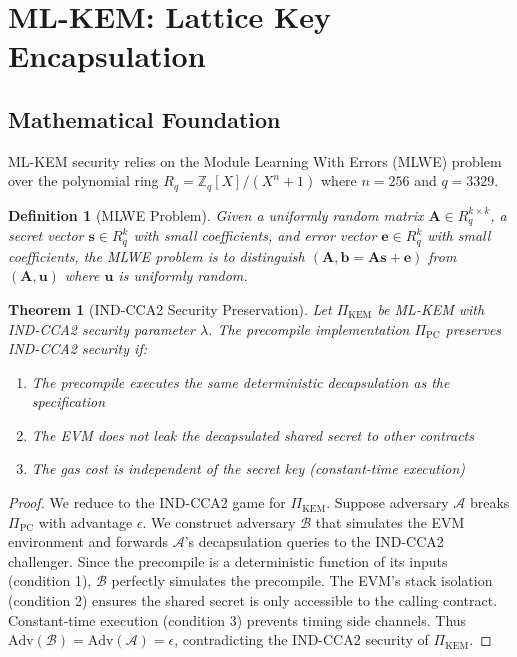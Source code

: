 \documentclass[11pt,letterpaper]{article}
\newtheorem{theorem}{Theorem}
\newtheorem{definition}{Definition}
\begin{document}
\section{ML-KEM: Lattice Key Encapsulation}

\subsection{Mathematical Foundation}

ML-KEM security relies on the Module Learning With Errors (MLWE) problem over the polynomial ring $R_q = \mathbb{Z}_q[X]/(X^n + 1)$ where $n = 256$ and $q = 3329$.

\begin{definition}[MLWE Problem]
Given a uniformly random matrix $\mathbf{A} \in R_q^{k \times k}$, a secret vector $\mathbf{s} \in R_q^k$ with small coefficients, and error vector $\mathbf{e} \in R_q^k$ with small coefficients, the MLWE problem is to distinguish $(\mathbf{A}, \mathbf{b} = \mathbf{A}\mathbf{s} + \mathbf{e})$ from $(\mathbf{A}, \mathbf{u})$ where $\mathbf{u}$ is uniformly random.
\end{definition}

\begin{theorem}[IND-CCA2 Security Preservation]
Let $\Pi_{\text{KEM}}$ be ML-KEM with IND-CCA2 security parameter $\lambda$. The precompile implementation $\Pi_{\text{PC}}$ preserves IND-CCA2 security if:
\begin{enumerate}
    \item The precompile executes the same deterministic decapsulation as the specification
    \item The EVM does not leak the decapsulated shared secret to other contracts
    \item The gas cost is independent of the secret key (constant-time execution)
\end{enumerate}
\end{theorem}

\begin{proof}
We reduce to the IND-CCA2 game for $\Pi_{\text{KEM}}$. Suppose adversary $\mathcal{A}$ breaks $\Pi_{\text{PC}}$ with advantage $\epsilon$. We construct adversary $\mathcal{B}$ that simulates the EVM environment and forwards $\mathcal{A}$'s decapsulation queries to the IND-CCA2 challenger. Since the precompile is a deterministic function of its inputs (condition 1), $\mathcal{B}$ perfectly simulates the precompile. The EVM's stack isolation (condition 2) ensures the shared secret is only accessible to the calling contract. Constant-time execution (condition 3) prevents timing side channels. Thus $\text{Adv}(\mathcal{B}) = \text{Adv}(\mathcal{A}) = \epsilon$, contradicting the IND-CCA2 security of $\Pi_{\text{KEM}}$.
\end{proof}
\end{document}
